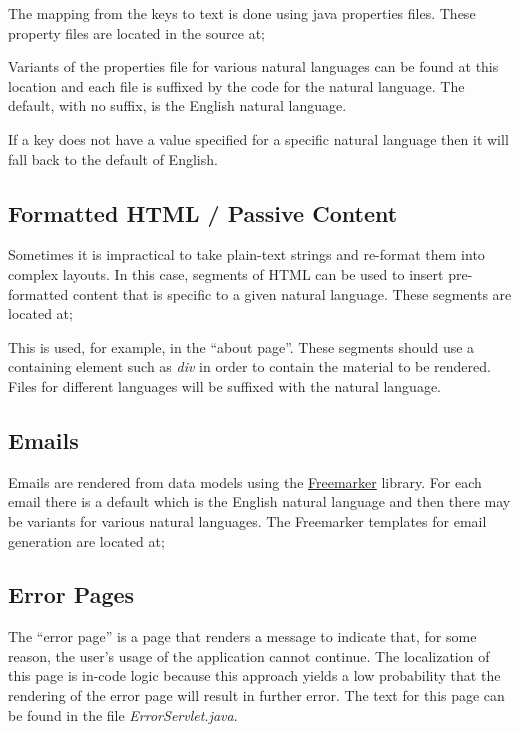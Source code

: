 The mapping from the keys to text is done using java properties files.  These property files are located in the source at;


Variants of the properties file for various natural languages can be found at this location and each file is suffixed by the code for the natural language.  The default, with no suffix, is the English natural language.

If a key does not have a value specified for a specific natural language then it will fall back to the default of English.

\subsection{Formatted HTML / Passive Content}

Sometimes it is impractical to take plain-text strings and re-format them into complex layouts.  In this case, segments of HTML can be used to insert pre-formatted content that is specific to a given natural language.  These segments are located at;


This is used, for example, in the ``about page''.  These segments should use a containing element such as {\it div} in order to contain the material to be rendered.  Files for different languages will be suffixed with the natural language.

\subsection{Emails}

Emails are rendered from data models using the \href{http://freemarker.org/}{Freemarker} library.  For each email there is a default which is the English natural language and then there may be variants for various natural languages.  The Freemarker templates for email generation are located at;


\subsection{Error Pages}

The ``error page'' is a page that renders a message to indicate that, for some reason, the user's usage of the application cannot continue.  The localization of this page is in-code logic because this approach yields a low probability that the rendering of the error page will result in further error.  The text for this page can be found in the file {\it ErrorServlet.java}.

